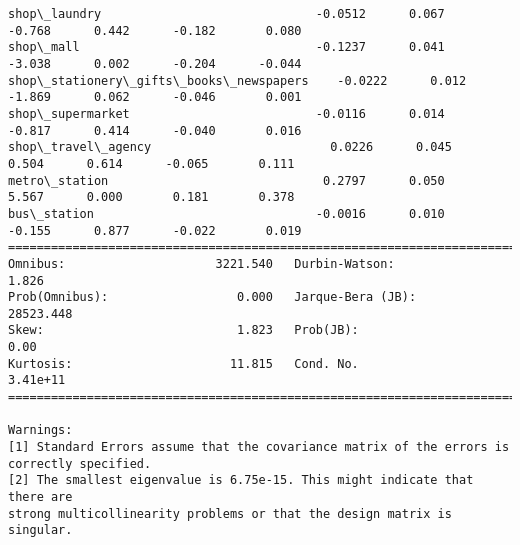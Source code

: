 \documentclass[11pt]{article}
\begin{document}
\begin{Verbatim}[commandchars=\\\{\}]
shop\_laundry                              -0.0512      0.067     -0.768      0.442      -0.182       0.080
shop\_mall                                 -0.1237      0.041     -3.038      0.002      -0.204      -0.044
shop\_stationery\_gifts\_books\_newspapers    -0.0222      0.012     -1.869      0.062      -0.046       0.001
shop\_supermarket                          -0.0116      0.014     -0.817      0.414      -0.040       0.016
shop\_travel\_agency                         0.0226      0.045      0.504      0.614      -0.065       0.111
metro\_station                              0.2797      0.050      5.567      0.000       0.181       0.378
bus\_station                               -0.0016      0.010     -0.155      0.877      -0.022       0.019
==============================================================================
Omnibus:                     3221.540   Durbin-Watson:                   1.826
Prob(Omnibus):                  0.000   Jarque-Bera (JB):            28523.448
Skew:                           1.823   Prob(JB):                         0.00
Kurtosis:                      11.815   Cond. No.                     3.41e+11
==============================================================================

Warnings:
[1] Standard Errors assume that the covariance matrix of the errors is correctly specified.
[2] The smallest eigenvalue is 6.75e-15. This might indicate that there are
strong multicollinearity problems or that the design matrix is singular.

    \end{Verbatim}
\end{document}
